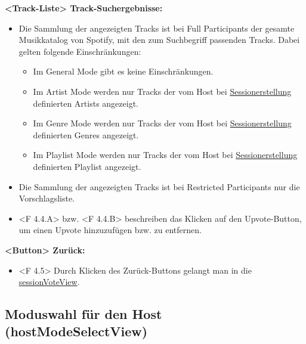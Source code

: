\documentclass[oneside, ngerman]{sdqtechreport}
\begin{document}
\textbf{<Track-Liste> Track-Suchergebnisse:}
\begin{itemize}
    \item Die Sammlung der angezeigten Tracks ist bei Full Participants der gesamte Musikkatalog von Spotify, mit den zum Suchbegriff passenden Tracks. Dabei gelten folgende Einschränkungen:
    \begin{itemize}
        \item Im General Mode gibt es keine Einschränkungen.
        \item Im Artist Mode werden nur Tracks der vom Host bei \hyperlink{hostModeSettingsView}{Sessionerstellung} definierten Artists angezeigt.
        \item Im Genre Mode werden nur Tracks der vom Host bei \hyperlink{hostModeSettingsView}{Sessionerstellung} definierten Genres angezeigt.
        \item Im Playlist Mode werden nur Tracks der vom Host bei \hyperlink{hostModeSettingsView}{Sessionerstellung} definierten Playlist angezeigt.
    \end{itemize}
    \item Die Sammlung der angezeigten Tracks ist bei Restricted Participants nur die Vorschlagsliste.
    \hypertarget{<F 4.4.A>}{}
    \hypertarget{ <F 4.4.B>}{}
    \item <F 4.4.A> bzw. <F 4.4.B> beschreiben das Klicken auf den Upvote-Button, um einen Upvote hinzuzufügen bzw. zu entfernen.
\end{itemize}

\textbf{<Button> Zurück:}
\begin{itemize}
    \hypertarget{<F 4.5>}{}
    \item <F 4.5> Durch Klicken des Zurück-Buttons gelangt man in die  \hyperlink{sessionVoteView}{sessionVoteView}.
\end{itemize}


\subsection{Moduswahl für den Host (hostModeSelectView)}
\label{sec:Benutzeroberfläche:hostModeSelectView}
\end{document}
